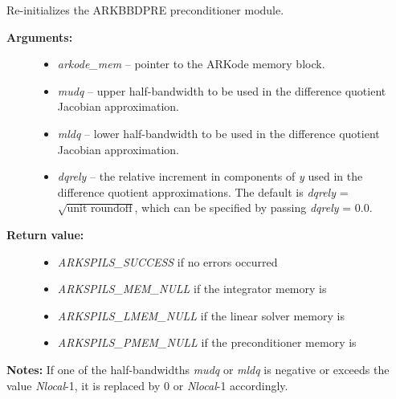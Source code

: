 \documentclass[letterpaper,10pt,english]{sphinxmanual}
\begin{document}
\begin{fulllineitems}
\label{c_interface/Preconditioners:c.ARKBBDPrecReInit}
Re-initializes the ARKBBDPRE preconditioner module.
\begin{description}
\item[{\textbf{Arguments:}}] \leavevmode\begin{itemize}
\item {} 
\emph{arkode\_mem} -- pointer to the ARKode memory block.

\item {} 
\emph{mudq} -- upper half-bandwidth to be used in the difference
quotient Jacobian approximation.

\item {} 
\emph{mldq} -- lower half-bandwidth to be used in the difference
quotient Jacobian approximation.

\item {} 
\emph{dqrely} -- the relative increment in components of \emph{y} used in
the difference quotient approximations.  The default is \emph{dqrely}
= \(\sqrt{\text{unit roundoff}}\), which can be specified by
passing \emph{dqrely} = 0.0.

\end{itemize}

\item[{\textbf{Return value:}}] \leavevmode\begin{itemize}
\item {} 
\emph{ARKSPILS\_SUCCESS} if no errors occurred

\item {} 
\emph{ARKSPILS\_MEM\_NULL} if the integrator memory is 

\item {} 
\emph{ARKSPILS\_LMEM\_NULL} if the linear solver memory is 

\item {} 
\emph{ARKSPILS\_PMEM\_NULL} if the preconditioner memory is 

\end{itemize}

\end{description}

\textbf{Notes:}  If one of the half-bandwidths \emph{mudq} or \emph{mldq} is
negative or exceeds the value \emph{Nlocal}-1, it is replaced by 0 or
\emph{Nlocal}-1 accordingly.

\end{fulllineitems}
\end{document}
